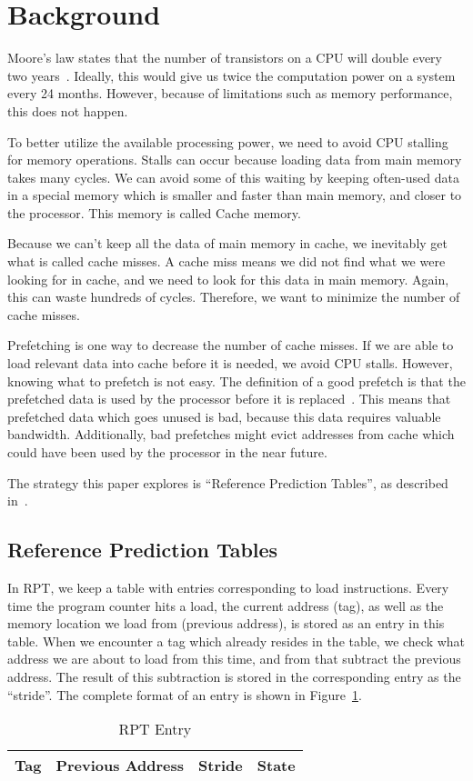 \section{Background} %


Moore's law states that the number of transistors on a CPU will double
every two years~\cite{moore}. Ideally, this would give us twice the
computation power on a system every 24 months. However, because of
limitations such as memory performance, this does not happen.

To better utilize the available processing power, we need to avoid CPU
stalling for memory operations. Stalls can occur because loading data
from main memory takes many cycles. We can avoid some of this waiting
by keeping often-used data in a special memory which is smaller and
faster than main memory, and closer to the processor. This memory is
called Cache memory.

Because we can't keep all the data of main memory in cache, we
inevitably get what is called cache misses. A cache miss means we did
not find what we were looking for in cache, and we need to look for
this data in main memory. Again, this can waste hundreds of
cycles. Therefore, we want to minimize the number of cache misses.

Prefetching is one way to decrease the number of cache misses. If we
are able to load relevant data into cache before it is needed, we
avoid CPU stalls. However, knowing what to prefetch is not easy. The
definition of a good prefetch is that the prefetched data is used by
the processor before it is
replaced~\cite{srinivasan_davidson_tyson_2004}. This means that
prefetched data which goes unused is bad, because this data requires
valuable bandwidth. Additionally, bad prefetches might evict addresses
from cache which could have been used by the processor in the near
future.

The strategy this paper explores is ``Reference Prediction Tables'', as
described in~\cite{chen_baer_1995}.

\subsection{Reference Prediction Tables}
In RPT, we keep a table with entries corresponding to load
instructions. Every time the program counter hits a load, the current
address (tag), as well as the memory location we load from
(previous address), is stored as an entry in this table. When we encounter a
tag which already resides in the table, we check what address we are
about to load from this time, and from that subtract the previous
address. The result of this subtraction is stored in the corresponding
entry as the ``stride''. The complete format of an entry is shown in
Figure~\ref{table:entry}.

\begin{table}
  \centering
  \begin{tabular}{ | c | c | c | c |}
    \hline
    Tag & Previous Address & Stride & State \\ \hline
  \end{tabular}
  \caption{RPT Entry}
  \label{table:entry}
\end{table}

